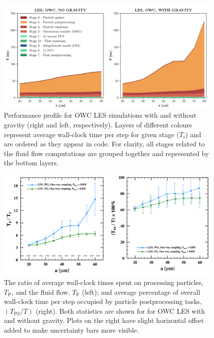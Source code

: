 
\begin{figure}
\centering
\includegraphics[width=13.5cm]{figures/3-06_pffowcles.pdf}
\caption{
Performance profile for OWC LES simulations with and without gravity (right and left, respectively).
Layers of different colours represent average wall-clock time per step for given stage ($T_i$) and are ordered as they appear in code.
For clarity, all stages related to the fluid flow computations are grouped together and represented by the bottom layers.
}
\label{fig:pffowcles}
\end{figure}


\begin{figure}
\centering
\includegraphics[width=13.5cm]{figures/3-07_pffowclesex.pdf}
\caption{
The ratio of average wall-clock times spent on processing particles, $T_{\text{P}}$, and the fluid flow, $T_{\text{F}}$ (left); and average percentage of overall wall-clock time per step occupied by particle postprocessing tasks, $(T_{\text{Pd}} / T)$ (right).
Both statistics are shown for for OWC LES with and without gravity.
Plots on the right have slight horizontal offset added to make uncertainty bars more visible.
}
\label{fig:pffowclesex}
\end{figure}

